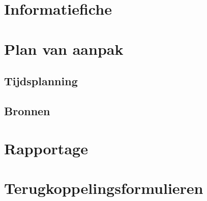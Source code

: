 \documentclass[a4paper]{article}
\begin{document}
  

  \begingroup
    \hypersetup{linkcolor=black}  %
    \tableofcontents
  \endgroup


  \section{Informatiefiche}
  

  \section{Plan van aanpak}
  

  \subsection{Tijdsplanning}
  

  \subsection{Bronnen}
  

  \section{Rapportage}
  

  \section{Terugkoppelingsformulieren}
  
\end{document}
